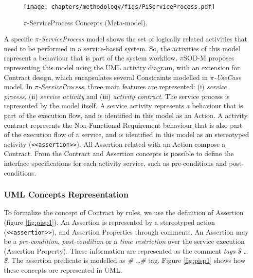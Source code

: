  \begin{figure}[ht!]
\centering
\texttt{[image: chapters/methodology/figs/PiServiceProcess.pdf]}
\caption{$\pi$-ServiceProcess Concepts (Meta-model).}
\label{fig:serviceprocess}
\end{figure}

A specific \textit{$\pi$-ServiceProcess} model shows the set of logically
related activities that need to be performed in a service-based system. So, the
activities of this model represent a behaviour that is part of the
system workflow. $\pi$SOD-M proposes representing this model using
the UML activity diagram, with an extension for {\sc Contract} design,
which encapsulates several {\sc Constraints} modelled in \textit{$\pi$-UseCase}
model. In \textit{$\pi$-ServiceProcess}, three main features are
represented: (i) \textit{service process}, (ii) \textit{service activity} and
(iii) \textit{activity contract}. The service process is represented by the
model itself. A service activity represents a behaviour that is part of the
execution flow, and is identified in this model as an {\sc Action}. A activity
contract represents the {\sc Non-Functional Requirement} behaviour that is also
part of the execution flow of a service, and is identified in this model as an
stereotyped activity (\texttt{<<assertion>>}). All {\sc Assertion} related with
an {\sc Action} compose a {\sc Contract}. From the {\sc Contract} and {\sc
Assertion} concepts is possible to define the interface specifications
for each activity service, such as pre-conditions and post-conditions.

\subsubsection{UML Concepts Representation} 
  
  
To formalize the concept of {\sc Contract} by rules, we use the definition of
{\sc Assertion} (figure \ref{fig:pisp1}). An {\sc Assertion} is represented by a
stereotyped action (\texttt{<<assertion>>}), and {\sc Assertion Properties}
through comments. An {\sc Assertion} may be a \textit{pre-condition},
\textit{post-condition} or a \textit{time restriction} over the service
execution ({\sc Assertion Property}). These information are represented as
the comment \textit{tags} \textit{\$ \ldots \$}. The assertion predicate is
modelled as \textit{\# \ldots \#} tag. Figure \ref{fig:pisp1} shows how these
concepts are represented in UML.



